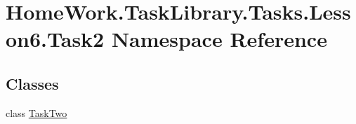 \hypertarget{namespace_home_work_1_1_task_library_1_1_tasks_1_1_lesson6_1_1_task2}{}\section{Home\+Work.\+Task\+Library.\+Tasks.\+Lesson6.\+Task2 Namespace Reference}
\label{namespace_home_work_1_1_task_library_1_1_tasks_1_1_lesson6_1_1_task2}
\subsection*{Classes}
\begin{DoxyCompactItemize}
\item 
class \mbox{\hyperlink{class_home_work_1_1_task_library_1_1_tasks_1_1_lesson6_1_1_task2_1_1_task_two}{Task\+Two}}
\end{DoxyCompactItemize}
